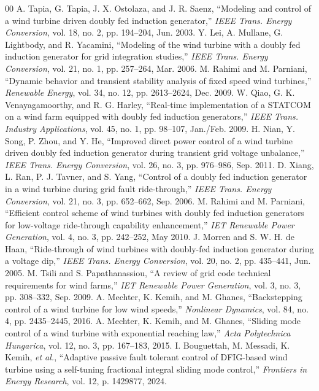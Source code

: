 \documentclass[conference]{IEEEtran}
\begin{document}
\begin{thebibliography}{00}
 A. Tapia, G. Tapia, J. X. Ostolaza, and J. R. Saenz, ``Modeling and control of a wind turbine driven doubly fed induction generator,'' \textit{IEEE Trans. Energy Conversion}, vol. 18, no. 2, pp. 194--204, Jun. 2003.
 Y. Lei, A. Mullane, G. Lightbody, and R. Yacamini, ``Modeling of the wind turbine with a doubly fed induction generator for grid integration studies,'' \textit{IEEE Trans. Energy Conversion}, vol. 21, no. 1, pp. 257--264, Mar. 2006.
 M. Rahimi and M. Parniani, ``Dynamic behavior and transient stability analysis of fixed speed wind turbines,'' \textit{Renewable Energy}, vol. 34, no. 12, pp. 2613--2624, Dec. 2009.
 W. Qiao, G. K. Venayagamoorthy, and R. G. Harley, ``Real-time implementation of a STATCOM on a wind farm equipped with doubly fed induction generators,'' \textit{IEEE Trans. Industry Applications}, vol. 45, no. 1, pp. 98--107, Jan./Feb. 2009.
 H. Nian, Y. Song, P. Zhou, and Y. He, ``Improved direct power control of a wind turbine driven doubly fed induction generator during transient grid voltage unbalance,'' \textit{IEEE Trans. Energy Conversion}, vol. 26, no. 3, pp. 976--986, Sep. 2011.
 D. Xiang, L. Ran, P. J. Tavner, and S. Yang, ``Control of a doubly fed induction generator in a wind turbine during grid fault ride-through,'' \textit{IEEE Trans. Energy Conversion}, vol. 21, no. 3, pp. 652--662, Sep. 2006.
 M. Rahimi and M. Parniani, ``Efficient control scheme of wind turbines with doubly fed induction generators for low-voltage ride-through capability enhancement,'' \textit{IET Renewable Power Generation}, vol. 4, no. 3, pp. 242--252, May 2010.
 J. Morren and S. W. H. de Haan, ``Ride-through of wind turbines with doubly-fed induction generator during a voltage dip,'' \textit{IEEE Trans. Energy Conversion}, vol. 20, no. 2, pp. 435--441, Jun. 2005.
 M. Tsili and S. Papathanassiou, ``A review of grid code technical requirements for wind farms,'' \textit{IET Renewable Power Generation}, vol. 3, no. 3, pp. 308--332, Sep. 2009.
 A. Mechter, K. Kemih, and M. Ghanes, ``Backstepping control of a wind turbine for low wind speeds,'' \textit{Nonlinear Dynamics}, vol. 84, no. 4, pp. 2435--2445, 2016.
 A. Mechter, K. Kemih, and M. Ghanes, ``Sliding mode control of a wind turbine with exponential reaching law,'' \textit{Acta Polytechnica Hungarica}, vol. 12, no. 3, pp. 167--183, 2015.
 I. Bouguettah, M. Messadi, K. Kemih, \textit{et al.}, ``Adaptive passive fault tolerant control of DFIG-based wind turbine using a self-tuning fractional integral sliding mode control,'' \textit{Frontiers in Energy Research}, vol. 12, p. 1429877, 2024.

\end{thebibliography}
\end{document}
